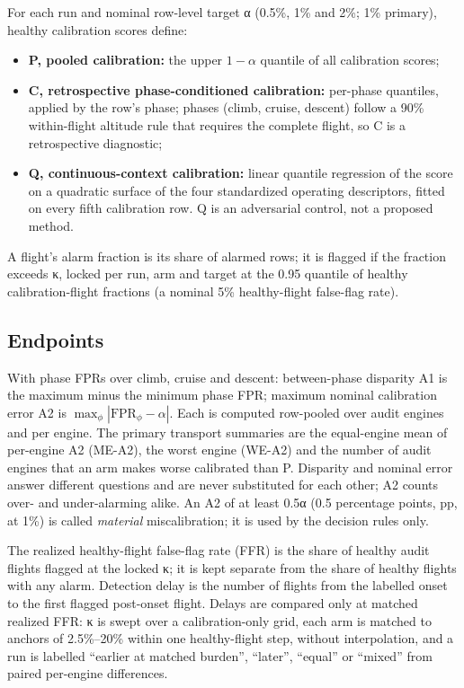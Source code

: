 \documentclass[preprint,11pt,a4paper]{elsarticle}
\begin{document}
For each run and nominal row-level target α (0.5\%, 1\% and 2\%; 1\% primary), healthy calibration scores define:
\begin{itemize}
\item \textbf{P, pooled calibration:} the upper $1-\alpha$ quantile of all calibration scores;
\item \textbf{C, retrospective phase-conditioned calibration:} per-phase quantiles, applied by the row's phase; phases (climb, cruise, descent) follow a 90\% within-flight altitude rule that requires the complete flight, so C is a retrospective diagnostic;
\item \textbf{Q, continuous-context calibration:} linear quantile regression of the score on a quadratic surface of the four standardized operating descriptors, fitted on every fifth calibration row. Q is an adversarial control, not a proposed method.
\end{itemize}

A flight's alarm fraction is its share of alarmed rows; it is flagged if the fraction exceeds κ, locked per run, arm and target at the 0.95 quantile of healthy calibration-flight fractions (a nominal 5\% healthy-flight false-flag rate).

\subsection{Endpoints}

With phase FPRs over climb, cruise and descent: between-phase disparity A1 is the maximum minus the minimum phase FPR; maximum nominal calibration error A2 is $\max_\phi |\mathrm{FPR}_\phi - \alpha|$. Each is computed row-pooled over audit engines and per engine. The primary transport summaries are the equal-engine mean of per-engine A2 (ME-A2), the worst engine (WE-A2) and the number of audit engines that an arm makes worse calibrated than P. Disparity and nominal error answer different questions and are never substituted for each other; A2 counts over- and under-alarming alike. An A2 of at least 0.5α (0.5 percentage points, pp, at 1\%) is called \emph{material} miscalibration; it is used by the decision rules only.

The realized healthy-flight false-flag rate (FFR) is the share of healthy audit flights flagged at the locked κ; it is kept separate from the share of healthy flights with any alarm. Detection delay is the number of flights from the labelled onset to the first flagged post-onset flight. Delays are compared only at matched realized FFR: κ is swept over a calibration-only grid, each arm is matched to anchors of 2.5\%–20\% within one healthy-flight step, without interpolation, and a run is labelled ``earlier at matched burden'', ``later'', ``equal'' or ``mixed'' from paired per-engine differences.
\end{document}
